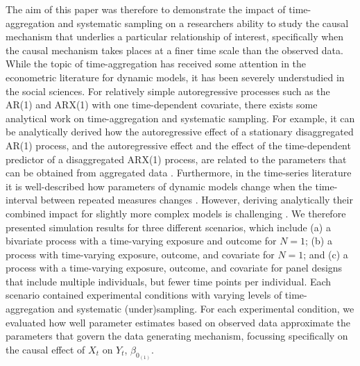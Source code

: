 \documentclass[man]{apa7} %
\begin{document}
The aim of this paper was therefore to demonstrate the impact of time-aggregation and systematic sampling on a researchers ability to study the causal mechanism that underlies a particular relationship of interest, specifically when the causal mechanism takes places at a finer time scale than the observed data. While the topic of time-aggregation has received some attention in the econometric literature for dynamic models, it has been severely understudied in the social sciences. For relatively simple autoregressive processes such as the AR(1) and ARX(1) with one time-dependent covariate, there exists some analytical work on time-aggregation and systematic sampling. For example, it can be analytically derived how the autoregressive effect of a stationary disaggregated AR(1) process, and the autoregressive effect and the effect of the time-dependent predictor of a disaggregated ARX(1) process, are related to the parameters that can be obtained from aggregated data \parencite[cf.][]{amemiya_effect_1972, brewer_consequences_1973}. Furthermore, in the time-series literature it is well-described how parameters of dynamic models change when the time-interval between repeated measures changes \parencite[e.g., due to systematic (under)sampling;][]{chatfield_analysis_2003}. However, deriving analytically their combined impact for slightly more complex models is challenging \parencite{amemiya_effect_1972, petkovic_aggregation_2009}. We therefore presented simulation results for three different scenarios, which include (a) a bivariate process with a time-varying exposure and outcome for $N = 1$; (b) a process with time-varying exposure, outcome, and covariate for $N = 1$; and (c) a process with a time-varying exposure, outcome, and covariate for panel designs that include multiple individuals, but fewer time points per individual. Each scenario contained experimental conditions with varying levels of time-aggregation and systematic (under)sampling. For each experimental condition, we evaluated how well parameter estimates based on observed data approximate the parameters that govern the data generating mechanism, focussing specifically on the causal effect of $X_{t}$ on $Y_{t}$, $\beta_{0_{(1)}}$. 
\end{document}
